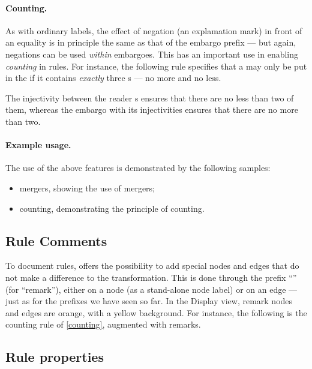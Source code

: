 
\paragraph{Counting.}

As with ordinary labels, the effect of negation (an explamation mark) in front
of an equality is in principle the same as
that of the embargo prefix --- but again, negations can be used \emph{within}
embargoes. This has an important use in enabling \emph{counting} in rules. For
instance, the following rule specifies that a  may only be put in
the  if it contains \emph{exactly} three s --- no
more and no less. 

%
The injectivity between the reader s ensures that there are no less
than two of them, whereas the embargo  with its injectivities
ensures that there are no more than two.

\paragraph{Example usage.}

The use of the above features is demonstrated by the following \Groove samples:
%
\begin{itemize}\noitemsep
\item \textsf{mergers}, showing the use of mergers;
\item \textsf{counting}, demonstrating the principle of counting.
\end{itemize}

\subsection{Rule Comments}

To document rules, \Groove{} offers the possibility to add special nodes and
edges that do not make a difference to the transformation. This is done through
the prefix ``\remP'' (for ``remark''), either on a node (as a stand-alone node
label) or on an edge --- just as for the prefixes we have seen so far. In the
Display view, remark nodes and edges are orange, with a yellow background. For
instance, the following is the counting rule of \eqref{counting}, augmented
with remarks.


\subsection{Rule properties}

